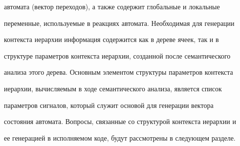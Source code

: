 автомата (вектор переходов), а также содержит глобальные и локальные 


переменные, используемые в реакциях автомата. Необходимая для генерации 


контекста иерархии информация содержится как в дереве ячеек, так и в 


структуре па\-ра\-мет\-ров контекста иерархии, созданной после семантического 


анализа этого дерева. Основным элементом структуры параметров контекста 


иерархии, вычисляемым в ходе семантического анализа, является список 


параметров сигналов, который служит основой для генерации вектора 


состояния автомата. Вопросы, связанные со структурой контекста иерархии и 


ее генерацией в исполняемом коде, будут рассмотрены в следующем разделе.


     


